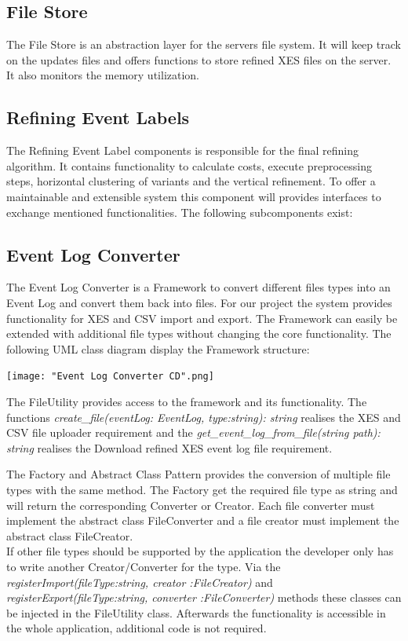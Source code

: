 \documentclass[notitlepage]{article}
\begin{document}
\begin{flushleft}
\subsection{File Store}
The File Store is an abstraction layer for the servers file system. It will keep track on the updates files and offers functions to store 
refined XES files on the server. It also monitors the memory utilization.
\subsection{Refining Event Labels}
The Refining Event Label components is responsible for the final refining algorithm. 
It contains functionality to calculate costs, execute preprocessing steps, horizontal clustering of variants and the vertical refinement.
To offer a maintainable and extensible system this component will provides interfaces to exchange mentioned functionalities. 
The following subcomponents exist: 


\subsection{Event Log Converter}
The Event Log Converter is a Framework to convert different files types into an Event Log and convert them back into files. 
For our project the system provides functionality for XES and CSV import and export. 
The Framework can easily be extended with additional file types without changing the core functionality.
\medskip
The following UML class diagram display the Framework structure:

\begin{landscape}
\texttt{[image: "Event Log Converter CD".png]}
\end{landscape}
The FileUtility provides access to the framework and its functionality.
The functions \textit{create\_file(eventLog: EventLog, type:string): string} realises the XES and CSV file uploader requirement and 
the \textit{get\_event\_log\_from\_file(string path): string} realises the Download refined XES event log file requirement. 

The Factory and Abstract Class Pattern provides the conversion of multiple file types with the same method. The Factory get the required file type as string and 
will return the corresponding Converter or Creator. Each file converter must implement the abstract class FileConverter and a file creator must implement
the abstract class FileCreator.\\
\medskip
If other file types should be supported by the application the developer only has to write another Creator/Converter for the type.
Via the \textit{registerImport(fileType:string, creator :FileCreator)} and \textit{registerExport(fileType:string, converter :FileConverter)} methods these classes can 
be injected in the FileUtility class. Afterwards the functionality is accessible in the whole application, additional code is not required.







\end{flushleft}
\end{document}
